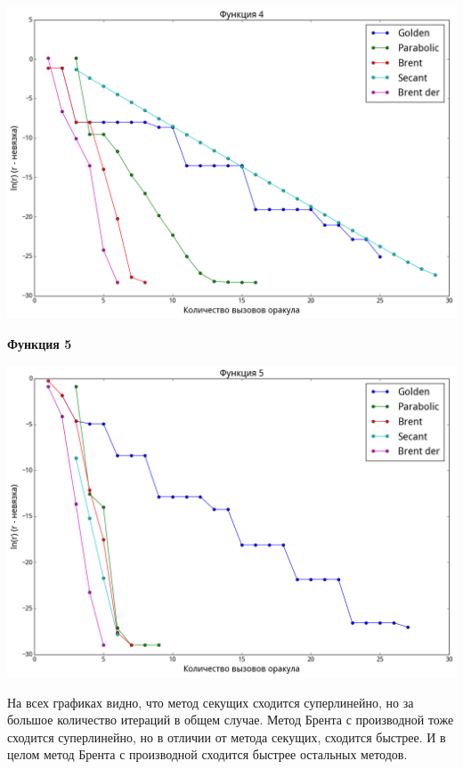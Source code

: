 \documentclass[12pt, a4paper]{article}
\begin{document}
        \begin{center}\includegraphics[width=\picwidth]{pics/fun4_der.png}\end{center}

        \newpage

        \textbf{Функция 5}

        \begin{center}\includegraphics[width=\picwidth]{pics/fun5_der.png}\end{center}

        На всех графиках видно, что метод секущих сходится суперлинейно, но за большое количество итераций в общем случае. Метод Брента с производной тоже сходится суперлинейно, но в отличии от метода секущих, сходится быстрее. И в целом метод Брента с производной сходится быстрее остальных методов.
\end{document}
